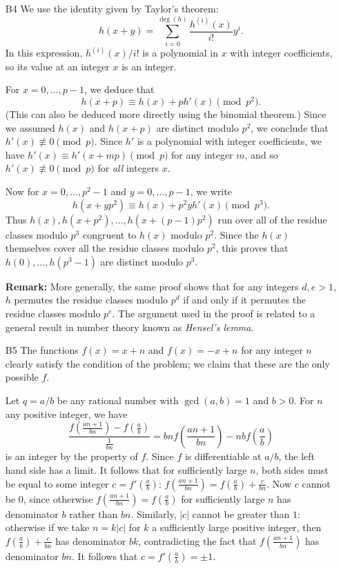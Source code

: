 \documentclass[amssymb,twocolumn,pra,10pt,aps]{revtex4-1}
\begin{document}
\begin{itemize}
\item[B4]
We use the identity given by Taylor's theorem:
\[
h(x+y) = \sum_{i=0}^{\deg(h)} \frac{h^{(i)}(x)}{i!} y^i.
\]
In this expression, $h^{(i)}(x)/i!$ is a polynomial in $x$
with integer coefficients, so its value at an integer $x$ is an
integer.

For $x = 0,\dots,p-1$, we deduce that
\[
h(x+p) \equiv h(x) + p h'(x) \pmod{p^2}.
\]
(This can also be deduced more directly using the binomial theorem.)
Since we assumed $h(x)$ and $h(x+p)$ are distinct modulo $p^2$,
we conclude that $h'(x) \not\equiv 0 \pmod{p}$. Since $h'$
is a polynomial with integer coefficients, we have
$h'(x) \equiv h'(x + mp) \pmod{p}$ for any integer $m$,
and so $h'(x) \not\equiv 0 \pmod{p}$ for \emph{all} integers $x$.

Now for $x= 0,\dots,p^2-1$ and $y=0,\dots,p-1$, we write
\[
h(x + y p^2) \equiv h(x) + p^2 y h'(x) \pmod{p^3}.
\]
Thus $h(x), h(x+p^2),\dots,h(x+(p-1)p^2)$ run over all of the residue
classes modulo $p^3$ congruent to $h(x)$ modulo $p^2$.
Since the $h(x)$ themselves cover all the residue classes modulo $p^2$,
this proves that $h(0), \dots, h(p^3-1)$ are distinct modulo $p^3$.

\textbf{Remark:}
More generally, the same proof shows that for any integers $d,e > 1$,
$h$ permutes the residue classes modulo $p^d$ if and only if it permutes
the residue classes modulo $p^e$. The argument used in the proof is related
to a general result in number theory known as
\emph{Hensel's lemma}.

\item[B5]
The functions $f(x) = x+n$ and $f(x)=-x+n$ for any integer $n$ clearly satisfy the condition of the problem; we claim that these are the only possible $f$.

Let $q=a/b$ be any rational number with $\gcd(a,b)=1$ and $b>0$. For $n$ any positive integer, we have
\[
\frac{f(\frac{an+1}{bn}) - f(\frac{a}{b})}{\frac{1}{bn}}
= bn f\left(\frac{an+1}{bn}\right) - nb f\left(\frac{a}{b}\right)
\]
is an integer by the property of $f$. Since $f$ is differentiable at $a/b$, the left hand side has a limit. It follows that for sufficiently large $n$, both sides must be equal to some integer $c=f'(\frac{a}{b})$: $f(\frac{an+1}{bn}) = f(\frac{a}{b})+\frac{c}{bn}$. Now $c$ cannot be $0$, since otherwise $f(\frac{an+1}{bn}) = f(\frac{a}{b})$ for sufficiently large $n$ has denominator $b$ rather than $bn$. Similarly, $|c|$ cannot be greater than $1$: otherwise
if we take $n=k|c|$ for $k$ a sufficiently large positive integer,
then $f(\frac{a}{b})+\frac{c}{bn}$ has denominator $bk$, contradicting the fact that $f(\frac{an+1}{bn})$ has denominator $bn$. It follows that $c = f'(\frac{a}{b}) = \pm 1$.


\end{itemize}
\end{document}

